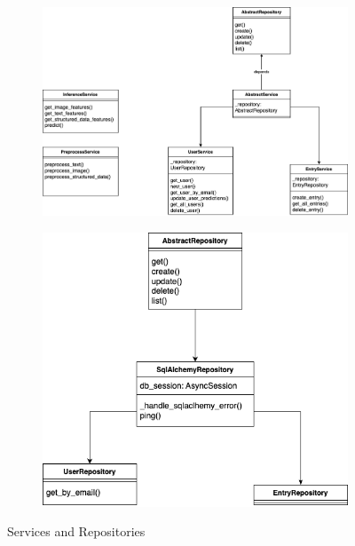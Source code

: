 \begin{figure}[ht]
        \begin{subfigure}[b]{0.57\linewidth}
            \centering
            \includegraphics[width=\linewidth]{images/webapp/backend/services.png}
            \label{fig:backend-services}
        \end{subfigure}
        \hfill
        \begin{subfigure}[b]{0.43\linewidth}
            \centering
            \includegraphics[width=\linewidth]{images/webapp/backend/repositories.png}
            \label{fig:backend-repositories}
        \end{subfigure}
        \caption{Services and Repositories}
        \label{fig:backend-design}
    \end{figure}

